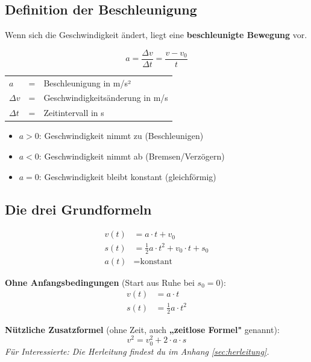\documentclass[11pt,a4paper]{article}
\begin{document}
\subsection{Definition der Beschleunigung}

Wenn sich die Geschwindigkeit ändert, liegt eine \textbf{beschleunigte Bewegung} vor.

\begin{formelbox}[Beschleunigung]
\[
\boxed{a = \frac{\Delta v}{\Delta t} = \frac{v - v_0}{t}}
\]
\begin{center}
\begin{tabular}{lcl}
$a$ & = & Beschleunigung in m/s² \\
$\Delta v$ & = & Geschwindigkeitsänderung in m/s \\
$\Delta t$ & = & Zeitintervall in s
\end{tabular}
\end{center}
\end{formelbox}

\begin{merksatz}
\begin{itemize}
\item $a > 0$: Geschwindigkeit nimmt zu (Beschleunigen)
\item $a < 0$: Geschwindigkeit nimmt ab (Bremsen/Verzögern)
\item $a = 0$: Geschwindigkeit bleibt konstant (gleichförmig)
\end{itemize}
\end{merksatz}

\subsection{Die drei Grundformeln}

\begin{formelbox}
\begin{align}
v(t) &= a \cdot t + v_0 \tag{Geschwindigkeit}\\[0.3em]
s(t) &= \frac{1}{2} a \cdot t^2 + v_0 \cdot t + s_0 \tag{Weg}\\[0.3em]
a(t) &= \text{konstant} \tag{Beschleunigung}
\end{align}

\vspace{0.3cm}
\textbf{Ohne Anfangsbedingungen} (Start aus Ruhe bei $s_0 = 0$):
\begin{align}
v(t) &= a \cdot t \\
s(t) &= \frac{1}{2} a \cdot t^2
\end{align}

\textbf{Nützliche Zusatzformel} (ohne Zeit, auch \textbf{„zeitlose Formel"} genannt):
\[
v^2 = v_0^2 + 2 \cdot a \cdot s
\]
\textit{Für Interessierte: Die Herleitung findest du im Anhang \ref{sec:herleitung}.}
\end{formelbox}
\end{document}
